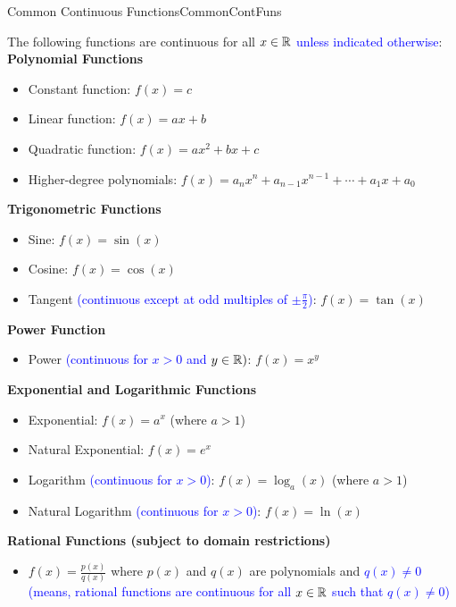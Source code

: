 \begin{propColor}{Common Continuous Functions}{CommonContFuns}

The following functions are continuous for all $x\in \mathbb R$ \textcolor{blue}{unless indicated otherwise}:\\

\textbf{Polynomial Functions}
\begin{itemize}
  \item Constant function: $ f(x) = c $
  \item Linear function: $ f(x) = ax + b $
  \item Quadratic function: $ f(x) = ax^2 + bx + c $
  \item Higher-degree polynomials: $ f(x) = a_nx^n + a_{n-1}x^{n-1} + \cdots + a_1x + a_0 $
\end{itemize}

\textbf{Trigonometric Functions}
\begin{itemize}
  \item Sine: $ f(x) = \sin(x) $
  \item Cosine: $ f(x) = \cos(x) $
  \item Tangent \textcolor{blue}{(continuous except at odd multiples of $ \pm \frac{\pi}{2} $)}: $ f(x) = \tan(x) $
\end{itemize}

\textbf{Power Function}
\begin{itemize}
  \item Power \textcolor{blue}{(continuous for $x > 0$ and $y \in \mathbb R)$}: $ f(x) = x^y $
\end{itemize}

\textbf{Exponential and Logarithmic Functions}
\begin{itemize}
  \item Exponential: $ f(x) = a^x $ (where $ a > 1 $)
  \item Natural Exponential: $ f(x) = e^x $
  \item Logarithm \textcolor{blue}{(continuous for $ x > 0 $)}: $ f(x) = \log_a(x) $ (where $ a > 1 $)
  \item Natural Logarithm \textcolor{blue}{(continuous for $ x > 0 $)}: $ f(x) = \ln(x) $
\end{itemize}

\textbf{Rational Functions (subject to domain restrictions)}
\begin{itemize}
  \item $ f(x) = \frac{p(x)}{q(x)} $ where $ p(x) $ and $ q(x) $ are polynomials and \textcolor{blue}{$ q(x) \neq 0 $ (means, rational functions are continuous for all $x\in \mathbb R$ such that $q(x)\neq 0$)}
\end{itemize}


\end{propColor}
